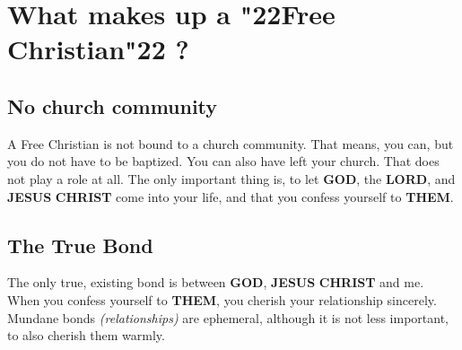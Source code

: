 \documentclass[12pt,a4paper]{article}
\newcommand{\Christ}[0]{\textbf{CHRIST}}
\newcommand{\God}[0]{\textbf{GOD}}
\newcommand{\Jesus}[0]{\textbf{JESUS}}
\newcommand{\Lord}[0]{\textbf{LORD}}
\newcommand{\Them}[0]{\textbf{THEM}}
\newcommand{\q}[1]{\char"22{#1}\char"22 }
\begin{document}
	
	\section{What makes up a \q{Free Christian}?}
	
	\subsection{No church community}
		A Free Christian is not bound to a church community.
		That means,
		you can,
		but you do not have to be baptized.
		You can also have left your church.
		That does not play a role at all.
		The only important thing is,
		to let {\God},
		the {\Lord},
		and {\Jesus} {\Christ} come into your life,
		and that you confess yourself to {\Them}.
	
	\subsection{The True Bond}
		The only true,
		existing bond is between {\God},
		{\Jesus} {\Christ} and me.
		When you confess yourself to {\Them},
		you cherish your relationship sincerely.
		Mundane bonds \textit{(relationships)} are ephemeral,
		although it is not less important,
		to also cherish them warmly.
	
\end{document}

